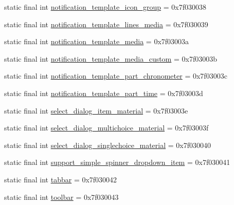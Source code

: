 \begin{CompactItemize}
\item 
static final int \hyperlink{classandroid_1_1support_1_1graphics_1_1drawable_1_1_r_1_1layout_bbe9874bf8816d8ce9c7c9056ea7122e}{notification\_\-template\_\-icon\_\-group} = 0x7f030038
\item 
static final int \hyperlink{classandroid_1_1support_1_1graphics_1_1drawable_1_1_r_1_1layout_6c595f693280116cdccf9514987ac028}{notification\_\-template\_\-lines\_\-media} = 0x7f030039
\item 
static final int \hyperlink{classandroid_1_1support_1_1graphics_1_1drawable_1_1_r_1_1layout_e5651c7ebaac6cf94d3d57f789c6df3d}{notification\_\-template\_\-media} = 0x7f03003a
\item 
static final int \hyperlink{classandroid_1_1support_1_1graphics_1_1drawable_1_1_r_1_1layout_c2251916882d303e7da8cb813a17c4ce}{notification\_\-template\_\-media\_\-custom} = 0x7f03003b
\item 
static final int \hyperlink{classandroid_1_1support_1_1graphics_1_1drawable_1_1_r_1_1layout_95ca394347030994e59525a1cecbf184}{notification\_\-template\_\-part\_\-chronometer} = 0x7f03003c
\item 
static final int \hyperlink{classandroid_1_1support_1_1graphics_1_1drawable_1_1_r_1_1layout_c4e70ed004ce13171c780ab22ec177a2}{notification\_\-template\_\-part\_\-time} = 0x7f03003d
\item 
static final int \hyperlink{classandroid_1_1support_1_1graphics_1_1drawable_1_1_r_1_1layout_f657325663744d5ff4ac5491aedb7a03}{select\_\-dialog\_\-item\_\-material} = 0x7f03003e
\item 
static final int \hyperlink{classandroid_1_1support_1_1graphics_1_1drawable_1_1_r_1_1layout_a6d8ecfdcb88f4f371850ec493bbb7ea}{select\_\-dialog\_\-multichoice\_\-material} = 0x7f03003f
\item 
static final int \hyperlink{classandroid_1_1support_1_1graphics_1_1drawable_1_1_r_1_1layout_fbfefb41a0962a9acc9504d788d67eda}{select\_\-dialog\_\-singlechoice\_\-material} = 0x7f030040
\item 
static final int \hyperlink{classandroid_1_1support_1_1graphics_1_1drawable_1_1_r_1_1layout_36dbd5345ed9dfe9ab65a6f46cef5750}{support\_\-simple\_\-spinner\_\-dropdown\_\-item} = 0x7f030041
\item 
static final int \hyperlink{classandroid_1_1support_1_1graphics_1_1drawable_1_1_r_1_1layout_ce4dbbdaab3207107f6c1d6ed0b1c232}{tabbar} = 0x7f030042
\item 
static final int \hyperlink{classandroid_1_1support_1_1graphics_1_1drawable_1_1_r_1_1layout_8457be3b327d9c8be1715a5fe04795fe}{toolbar} = 0x7f030043
\end{CompactItemize}


